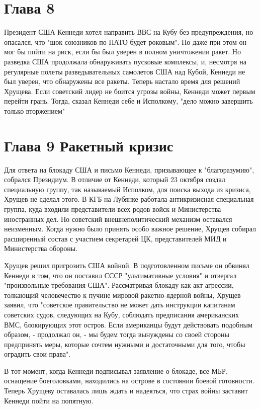 \documentclass[14pt]{extreport}
\begin{document}
\section{Глава 8}

Президент США Кеннеди хотел направить ВВС на Кубу без предупреждения, но опасался, что "шок союзников по НАТО будет роковым". Но даже при этом он мог бы пойти на риск, если бы был уверен в полном уничтожении ракет. Но разведка США продолжала обнаруживать пусковые комплексы, и, несмотря на регулярные полеты разведывательных самолетов США над Кубой, Кеннеди не был уверен, что обнаружены все ракеты. Теперь настало время для решений Хрущева. Если советский лидер не боится угрозы войны, Кеннеди может первым перейти грань. Тогда, сказал Кеннеди себе и Исполкому, "дело можно завершить только вторжением"


\section{Глава 9 Ракетный кризис}

Для ответа на блокаду США и письмо Кеннеди, призывающее к "благоразумию", собрался Президиум. В отличие от Кеннеди, который 23 октября создал специальную группу, так называемый Исполком, для поиска выхода из кризиса, Хрущев не сделал этого. В КГБ на Лубянке работала антикризисная специальная группа, куда входили представители всех родов войск и Министерства иностранных дел. Но советский внешнеполитический механизм оставался неизменным. Когда нужно было принять особо важное решение, Хрущев собирал расширенный состав с участием секретарей ЦК, представителей МИД и Министерства обороны.

Хрущев решил пригрозить США войной. В подготовленном письме он обвинял Кеннеди в том, что он поставил СССР "ультимативные условия" и отвергал "произвольные требования США". Рассматривая блокаду как акт агрессии, толкающий человечество к пучине мировой ракетно-ядерной войны, Хрущев заявил, что "советское правительство не может дать инструкции капитанам советских судов, следующих на Кубу, соблюдать предписания американских ВМС, блокирующих этот остров. Если американцы будут действовать подобным образом, - продолжал он, - мы будем тогда вынуждены со своей стороны предпринять меры, которые сочтем нужными и достаточными для того, чтобы оградить свои права".

В тот момент, когда Кеннеди подписывал заявление о блокаде, все МБР, оснащение боеголовками, находились на острове в состоянии боевой готовности. Теперь Хрущеву оставалась лишь ждать и надеяться, что страх войны заставит Кеннеди пойти на попятную.
\end{document}
